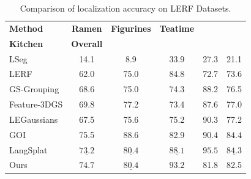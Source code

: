 \begin{table}[t]
    \centering
    \footnotesize
    \begin{tabular}{lccccc}
    \toprule
        \textbf{Method}& 
        \hspace{-2pt}\textbf{Ramen}\hspace{-2pt} & \hspace{-2pt}\textbf{Figurines}\hspace{-2pt} & \hspace{-2pt}\textbf{Teatime}\hspace{-2pt} & \hspace{-2pt}\makecell{\textbf{Waldo}\\\textbf{Kitchen}}\hspace{-2pt} & \hspace{-2pt}\textbf{Overall}\hspace{-2pt} \\
        \midrule
        LSeg & 14.1 & 8.9 & 33.9 & 27.3 & 21.1 \\
        LERF & 62.0 & 75.0 & 84.8 & 72.7 & 73.6 \\
        GS-Grouping & 68.6 & 75.0 & 74.3 & 88.2 & 76.5 \\
        Feature-3DGS & 69.8 & 77.2 & 73.4 & 87.6 & 77.0 \\
        LEGaussians & 67.5 & 75.6 & 75.2 & 90.3 & 77.2 \\
        GOI & 75.5 & $\mathbf{88.6}$ & 82.9 & $\underline{90.4}$ & $\mathbf{84.4}$ \\
        LangSplat & $\underline{73.2}$ & $\underline{80.4}$ & $\underline{88.1}$ & $\mathbf{95.5}$ & $\underline{84.3}$ \\
        Ours & $\mathbf{74.7}$ & $\underline{80.4}$ & $\mathbf{93.2}$ & 81.8 & 82.5 \\
        \bottomrule
        \end{tabular}
        \caption{Comparison of localization accuracy on LERF Datasets.}
        \label{tab:lerf-loc-acc}
\end{table}